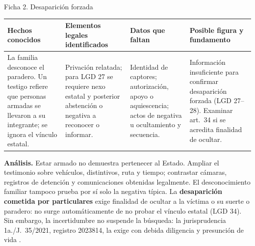 \documentclass[spanish,letterpaper,oneside]{article}
\makeatletter
\renewcommand{\arraystretch}{1.08}
\newcommand{\tablaficha}[1]{%
  \begingroup\fontsize{10.4}{11.7}\selectfont
  \setlength{\tabcolsep}{3pt}\renewcommand{\arraystretch}{1.12}
  \begin{tabularx}{\linewidth}{@{}*{4}{>{\raggedright\arraybackslash}X}@{}}
  \toprule
  \textbf{Hechos conocidos} & \textbf{Elementos legales identificados} & \textbf{Datos que faltan} & \textbf{Posible figura y fundamento} \\
  \midrule
  #1
  \bottomrule
  \end{tabularx}
  \endgroup\par\vspace{4pt}
}
\makeatother
\begin{document}
\begin{casoestudio}{Ficha 2. Desaparición forzada}
\tablaficha{
La familia desconoce el paradero. Un testigo refiere que personas armadas se llevaron a su integrante; se ignora el vínculo estatal. & Privación relatada; para LGD 27 se requiere nexo estatal y posterior abstención o negativa a reconocer o informar. & Identidad de captores; autorización, apoyo o aquiescencia; actos de negativa u ocultamiento y secuencia. & Información insuficiente para confirmar desaparición forzada (LGD 27--28). Examinar art.~34 si se acredita finalidad de ocultar. \\
}
\textbf{Análisis.} Estar armado no demuestra pertenecer al Estado. Ampliar el testimonio sobre vehículos, distintivos, ruta y tiempo; contrastar cámaras, registros de detención y comunicaciones obtenidas legalmente. El desconocimiento familiar tampoco prueba por sí solo la negativa típica. La \textbf{desaparición cometida por particulares} exige finalidad de ocultar a la víctima o su suerte o paradero: no surge automáticamente de no probar el vínculo estatal (LGD 34). Sin embargo, la incertidumbre no suspende la búsqueda: la jurisprudencia 1a./J.~35/2021, registro 2023814, la exige con debida diligencia y presunción de vida \citep{desaparicionS5,scjnBusquedaS5}.
\end{casoestudio}

\clearpage
\end{document}

